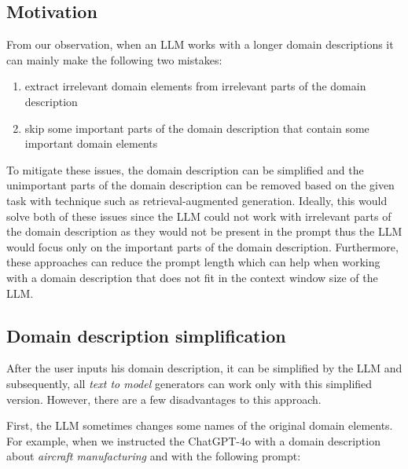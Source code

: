 \subsection{Motivation}

From our observation, when an LLM works with a longer domain descriptions it can mainly make the following two mistakes:

\begin{enumerate}
\item extract irrelevant domain elements from irrelevant parts of the domain description
\item skip some important parts of the domain description that contain some important domain elements
\end{enumerate}


\noindent{}To mitigate these issues, the domain description can be simplified and the unimportant parts of the domain description can be removed based on the given task with technique such as retrieval-augmented generation. Ideally, this would solve both of these issues since the LLM could not work with irrelevant parts of the domain description as they would not be present in the prompt thus the LLM would focus only on the important parts of the domain description.
Furthermore, these approaches can reduce the prompt length which can help when working with a domain description that does not fit in the context window size of the LLM.



\subsection{Domain description simplification}

After the user inputs his domain description, it can be simplified by the LLM and subsequently, all \emph{text to model} generators can work only with this simplified version. However, there are a few disadvantages to this approach.

First, the LLM sometimes changes some names of the original domain elements. For example, when we instructed the ChatGPT-4o with a domain description about \emph{aircraft manufacturing} and with the following prompt: \\

